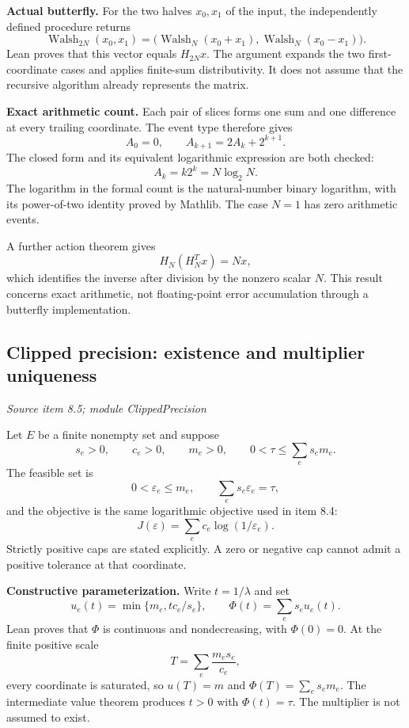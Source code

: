 \textbf{Actual butterfly.} For the two halves $x_0,x_1$ of the input, the independently defined procedure returns
\[
\operatorname{Walsh}_{2N}(x_0,x_1)
=\bigl(\operatorname{Walsh}_N(x_0+x_1),
       \operatorname{Walsh}_N(x_0-x_1)\bigr).
\]
Lean proves that this vector equals $H_{2N}x$. The argument expands the two first-coordinate cases and applies finite-sum distributivity. It does not assume that the recursive algorithm already represents the matrix.

\textbf{Exact arithmetic count.} Each pair of slices forms one sum and one difference at every trailing coordinate. The event type therefore gives
\[
A_0=0,\qquad A_{k+1}=2A_k+2^{k+1}.
\]
The closed form and its equivalent logarithmic expression are both checked:
\[
\boxed{A_k=k2^k=N\log_2N.}
\]
The logarithm in the formal count is the natural-number binary logarithm, with its power-of-two identity proved by Mathlib. The case $N=1$ has zero arithmetic events.

A further action theorem gives
\[
H_N(H_N^Tx)=Nx,
\]
which identifies the inverse after division by the nonzero scalar $N$. This result concerns exact arithmetic, not floating-point error accumulation through a butterfly implementation.



\subsection{Clipped precision: existence and multiplier uniqueness}\label{supp4:subsection:005}\textit{Source item 8.5; module ClippedPrecision}\par
Let $E$ be a finite nonempty set and suppose
\[
s_e>0,\qquad c_e>0,\qquad m_e>0,
\qquad 0<\tau\le\sum_e s_em_e.
\]
The feasible set is
\[
0<\varepsilon_e\le m_e,\qquad \sum_e s_e\varepsilon_e=\tau,
\]
and the objective is the same logarithmic objective used in item 8.4:
\[
J(\varepsilon)=\sum_e c_e\log(1/\varepsilon_e).
\]
Strictly positive caps are stated explicitly. A zero or negative cap cannot admit a positive tolerance at that coordinate.

\textbf{Constructive parameterization.} Write $t=1/\lambda$ and set
\[
u_e(t)=\min\{m_e,tc_e/s_e\},\qquad
\Phi(t)=\sum_e s_eu_e(t).
\]
Lean proves that $\Phi$ is continuous and nondecreasing, with $\Phi(0)=0$. At the finite positive scale
\[
T=\sum_e\frac{m_es_e}{c_e},
\]
every coordinate is saturated, so $u(T)=m$ and $\Phi(T)=\sum_es_em_e$. The intermediate value theorem produces $t>0$ with $\Phi(t)=\tau$. The multiplier is not assumed to exist.

